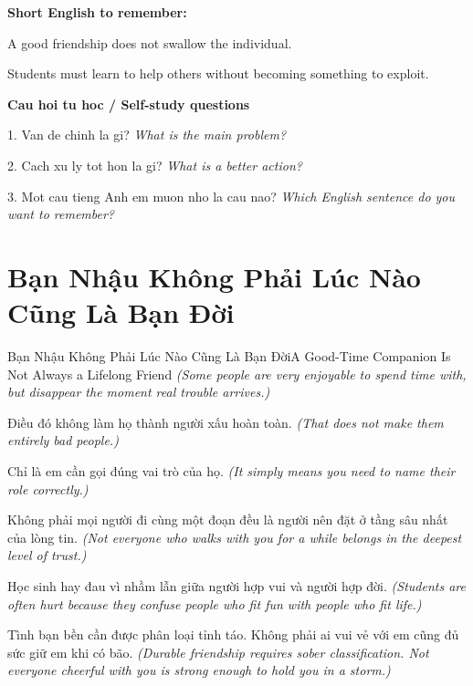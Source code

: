 \begin{ghinhoanh}
\textbf{Short English to remember:}

A good friendship does not swallow the individual.

Students must learn to help others without becoming something to exploit.

\end{ghinhoanh}

\begin{tuhocnhanh}
\textbf{Cau hoi tu hoc / Self-study questions}

1. Van de chinh la gi? \textit{What is the main problem?}

2. Cach xu ly tot hon la gi? \textit{What is a better action?}

3. Mot cau tieng Anh em muon nho la cau nao? \textit{Which English sentence do you want to remember?}
\end{tuhocnhanh}
\ngancach

\section{Bạn Nhậu Không Phải Lúc Nào Cũng Là Bạn Đời}
\begin{truyen}{Bạn Nhậu Không Phải Lúc Nào Cũng Là Bạn Đời}{A Good-Time Companion Is Not Always a Lifelong Friend}
\textit{(Some people are very enjoyable to spend time with, but disappear the moment real trouble arrives.)}

Điều đó không làm họ thành người xấu hoàn toàn.
\textit{(That does not make them entirely bad people.)}

Chỉ là em cần gọi đúng vai trò của họ.
\textit{(It simply means you need to name their role correctly.)}

Không phải mọi người đi cùng một đoạn đều là người nên đặt ở tầng sâu nhất của lòng tin.
\textit{(Not everyone who walks with you for a while belongs in the deepest level of trust.)}

Học sinh hay đau vì nhầm lẫn giữa người hợp vui và người hợp đời.
\textit{(Students are often hurt because they confuse people who fit fun with people who fit life.)}

\end{truyen}

\begin{baihoc}
Tình bạn bền cần được phân loại tỉnh táo. Không phải ai vui vẻ với em cũng đủ sức giữ em khi có bão.
\textit{(Durable friendship requires sober classification. Not everyone cheerful with you is strong enough to hold you in a storm.)}
\end{baihoc}

